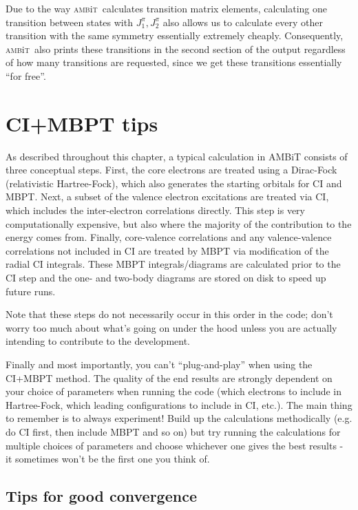 \documentclass{report}
\newcommand{\ambit}{\textsc{amb}{\footnotesize i}\textsc{t}}
\begin{document}
Due to the way \ambit\  calculates transition matrix elements, calculating one transition between states
with $J^{\pi}_1, J^{\pi}_2$ also allows us to calculate every other transition with the same 
symmetry essentially extremely cheaply. Consequently, \ambit\  also prints these transitions in the 
second section of the output regardless of how many transitions are requested, since we get these
transitions essentially ``for free''.

\section{CI+MBPT tips}
\label{sec:CI_tips}

As described throughout this chapter, a typical calculation in AMBiT consists of three conceptual steps.
First, the core electrons are treated using a Dirac-Fock (relativistic
Hartree-Fock), which also generates the starting orbitals for CI and
MBPT. Next, a subset of the valence electron excitations are treated via
CI, which includes the inter-electron correlations directly. This step
is very computationally expensive, but also where the majority of the
contribution to the energy comes from. Finally, core-valence
correlations and any valence-valence correlations not included in CI are
treated by MBPT via modification of the radial CI integrals. These MBPT
integrals/diagrams are calculated prior to the CI step and the one- and
two-body diagrams are stored on disk to speed up future runs.

Note that these steps do not necessarily occur in this order in
the code; don't worry too much about what's going on under the hood
unless you are actually intending to contribute to the development.

Finally and most importantly, you can't ``plug-and-play'' when using the CI+MBPT method. The quality of 
the end results are strongly
dependent on your choice of parameters when running the code (which
electrons to include in Hartree-Fock, which leading configurations to
include in CI, etc.). The main thing to remember is to always
experiment! Build up the calculations methodically (e.g. do CI first,
then include MBPT and so on) but try running the calculations for
multiple choices of parameters and choose whichever one gives the best
results - it sometimes won't be the first one you think of.

\subsection{Tips for good convergence}
\end{document}
